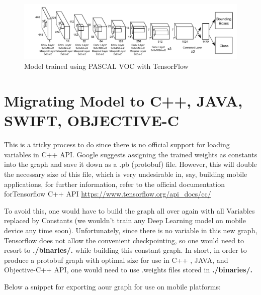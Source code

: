 \vspace{5mm}
\begin{figure}[h]
\setlength{\belowcaptionskip}{-30pt}
\centering
\includegraphics[scale=0.4]{figures/retrained_model.png}
\caption{Model trained  using PASCAL VOC with TensorFlow}
\label{retrained_model}
\end{figure}

\newpage
\section{Migrating Model to C++, JAVA, SWIFT, OBJECTIVE-C}

This is a tricky process to do since there is no official support for loading variables in C++ API. Google suggests assigning the trained weights as constants into the graph and save it down as a .pb (protobuf) file. However, this will double the necessary size of this file, which is very undesirable in, say, building mobile applications, for further information, refer to the official documentation forTensorflow C++ API  \url{https://www.tensorflow.org/api_docs/cc/}

To avoid this, one would have to build the graph all over again with all Variables replaced by Constants (we wouldn’t train any Deep Learning model on mobile device any time soon). Unfortunately, since there is no variable in this new graph, Tensorflow does not allow the convenient checkpointing, so one would need to resort to  \textbf{./binaries/.} while building this constant graph. In short, in order to produce a protobuf graph with optimal size for use in C++ , JAVA, and Objective-C++ API, one would need to use .weights files stored in \textbf{./binaries/.}

\vspace{5mm}
Below a snippet for exporting aour graph for use on mobile platforms:

